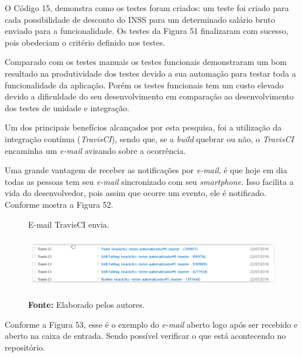 \par O Código 15, demonstra como os testes foram criados: um teste foi criado para cada possibilidade de desconto do INSS para um determinado salário bruto enviado para a funcionalidade. Os testes da Figura 51 finalizaram com sucesso, pois obedeciam o critério definido nos testes.

\par Comparado com os testes manuais os testes funcionais demonstraram um bom resultado na produtividade dos testes devido a sua automação para testar toda a funcionalidade da aplicação. Porém os testes funcionais tem um custo elevado devido a dificuldade do seu desenvolvimento em comparação ao desenvolvimento dos testes de unidade e integração.
 
 \par Um dos principais benefícios alcançados por esta pesquisa, foi a utilização da integração contínua (\textit{TravisCI}), sendo que, se a \textit{build} quebrar ou não, o \textit{TravisCI} encaminha um \textit{e-mail} avisando sobre a ocorrência. 
 
\par Uma grande vantagem de receber as notificações por \textit{e-mail}, é que hoje em dia todas as pessoas tem seu \textit{e-mail} sincronizado com seu \textit{smartphone}. Isso facilita a vida do desenvolvedor, pois assim que ocorre um evento, ele é notificado. Conforme mostra a Figura 52.
 
 
\begin{figure}[!htb]
    \caption[E-mail TravisCI envia ]{E-mail TravisCI envia.
     \centering
     \includegraphics[width=14cm,height=3cm]{imagens/travis12.png}
     \textbf{Fonte: } Elaborado pelos autores.}
     \label{fig:e-mail TravisCI envia}
\end{figure}


\par Conforme a Figura 53, esse é o exemplo do \textit{e-mail} aberto logo após ser recebido e aberto na caixa de entrada. Sendo possível verificar o que está acontecendo no repositório.

